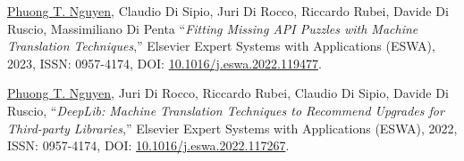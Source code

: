 \documentclass[a4paper,9pt]{article} %
\begin{document}
\begin{thebibliography}{100}

	
	

	\underline{Phuong T. Nguyen}, Claudio Di Sipio, Juri Di Rocco, Riccardo Rubei, Davide Di Ruscio, Massimiliano Di Penta ``\emph{Fitting Missing API Puzzles with Machine Translation Techniques},'' Elsevier Expert Systems with Applications (ESWA), 2023, ISSN: 0957-4174, DOI: \href{https://doi.org/10.1016/j.eswa.2022.119477}{10.1016/j.eswa.2022.119477}. 
	

	\underline{Phuong T. Nguyen}, Juri Di Rocco, Riccardo Rubei, Claudio Di Sipio, Davide Di Ruscio, ``\emph{DeepLib: Machine Translation Techniques to Recommend Upgrades for Third-party Libraries},'' Elsevier Expert Systems with Applications (ESWA), 2022, ISSN: 0957-4174, DOI: \href{https://doi.org/10.1016/j.eswa.2022.117267}{10.1016/j.eswa.2022.117267}.

%	
	

\end{thebibliography}
\end{document}
